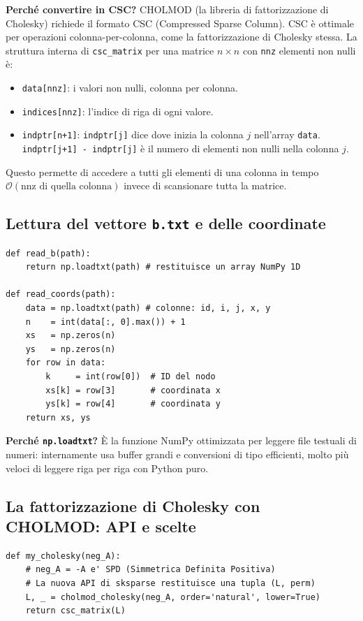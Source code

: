 \documentclass[a4paper,11pt]{article}
\theoremstyle{definition}
\begin{document}
\textbf{Perché convertire in CSC?} CHOLMOD (la libreria di fattorizzazione di Cholesky) richiede il formato CSC (Compressed Sparse Column). CSC è ottimale per operazioni colonna-per-colonna, come la fattorizzazione di Cholesky stessa. La struttura interna di \texttt{csc\_matrix} per una matrice $n \times n$ con \texttt{nnz} elementi non nulli è:
\begin{itemize}
  \item \texttt{data[nnz]}: i valori non nulli, colonna per colonna.
  \item \texttt{indices[nnz]}: l'indice di riga di ogni valore.
  \item \texttt{indptr[n+1]}: \texttt{indptr[j]} dice dove inizia la colonna $j$ nell'array \texttt{data}. \texttt{indptr[j+1] - indptr[j]} è il numero di elementi non nulli nella colonna $j$.
\end{itemize}
Questo permette di accedere a tutti gli elementi di una colonna in tempo $\mathcal{O}(\text{nnz di quella colonna})$ invece di scansionare tutta la matrice.

\subsection{Lettura del vettore \texttt{b.txt} e delle coordinate}

\begin{lstlisting}[style=python, caption={Lettura del termine noto e delle coordinate}]
def read_b(path):
    return np.loadtxt(path) # restituisce un array NumPy 1D

def read_coords(path):
    data = np.loadtxt(path) # colonne: id, i, j, x, y
    n    = int(data[:, 0].max()) + 1
    xs   = np.zeros(n)
    ys   = np.zeros(n)
    for row in data:
        k     = int(row[0])  # ID del nodo
        xs[k] = row[3]       # coordinata x
        ys[k] = row[4]       # coordinata y
    return xs, ys
\end{lstlisting}

\textbf{Perché \texttt{np.loadtxt}?} È la funzione NumPy ottimizzata per leggere file testuali di numeri: internamente usa buffer grandi e conversioni di tipo efficienti, molto più veloci di leggere riga per riga con Python puro.

\subsection{La fattorizzazione di Cholesky con CHOLMOD: API e scelte}

\begin{lstlisting}[style=python, caption={La funzione my\_cholesky con l'API aggiornata}]
def my_cholesky(neg_A):
    # neg_A = -A e' SPD (Simmetrica Definita Positiva)
    # La nuova API di sksparse restituisce una tupla (L, perm)
    L, _ = cholmod_cholesky(neg_A, order='natural', lower=True)
    return csc_matrix(L)
\end{lstlisting}
\end{document}
